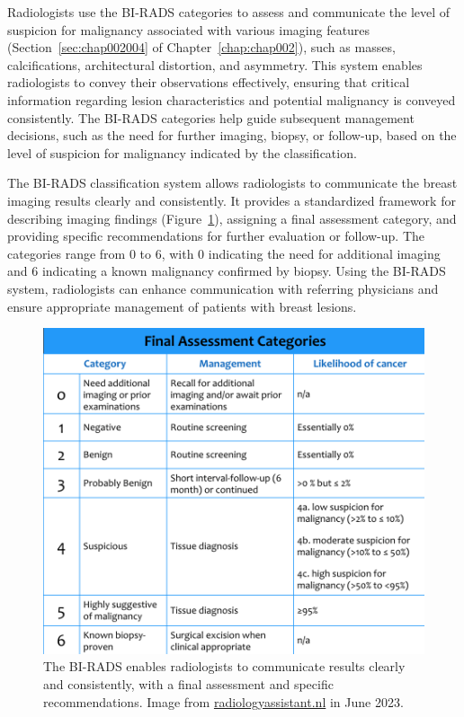 Radiologists use the \ac{BI-RADS} categories to assess and communicate the level of suspicion for malignancy associated with various imaging features (Section~\ref{sec:chap002004} of Chapter~\ref{chap:chap002}), such as masses, calcifications, architectural distortion, and asymmetry.
This system enables radiologists to convey their observations effectively, ensuring that critical information regarding lesion characteristics and potential malignancy is conveyed consistently.
The \ac{BI-RADS} categories help guide subsequent management decisions, such as the need for further imaging, biopsy, or follow-up, based on the level of suspicion for malignancy indicated by the classification.

The \ac{BI-RADS} classification system allows radiologists to communicate the breast imaging results clearly and consistently.
It provides a standardized framework for describing imaging findings (Figure~\ref{fig:fig020}), assigning a final assessment category, and providing specific recommendations for further evaluation or follow-up.
The categories range from 0 to 6, with 0 indicating the need for additional imaging and 6 indicating a known malignancy confirmed by biopsy.
Using the \ac{BI-RADS} system, radiologists can enhance communication with referring physicians and ensure appropriate management of patients with breast lesions.

\begin{figure}[ht]
\centering
\includegraphics[width=\columnwidth]{images/fig020}
\caption{The BI-RADS enables radiologists to communicate results clearly and consistently, with a final assessment and specific recommendations. Image from \protect\href{https://radiologyassistant.nl/breast/bi-rads/bi-rads-for-mammography-and-ultrasound-2013}{radiologyassistant.nl} in June 2023.}
\label{fig:fig020}
\end{figure}

